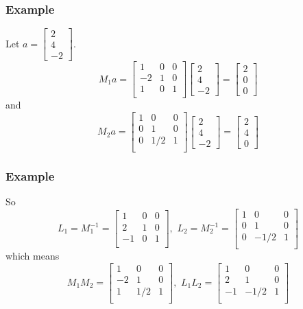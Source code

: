 \documentclass[10pt]{beamer}
\begin{document}
\begin{frame}\frametitle{Example}
Let $a=\begin{bmatrix}2 \\ 4 \\ -2\end{bmatrix}$.
\[
M_1 a =
\begin{bmatrix}
  1 & 0 & 0\\
-2 & 1 & 0\\
1 & 0 & 1\\
\end{bmatrix}
\begin{bmatrix}
2 \\ 4 \\ -2
\end{bmatrix}
     =
\begin{bmatrix}
2 \\ 0 \\ 0
\end{bmatrix}
\]
and
\[
M_2 a =
\begin{bmatrix}
  1 & 0 & 0\\
0 & 1 & 0\\
0 & 1/2 & 1\\
\end{bmatrix}
\begin{bmatrix}
2 \\ 4 \\ -2
\end{bmatrix}
      =
\begin{bmatrix}
2 \\ 4 \\ 0
\end{bmatrix}
\]
\end{frame}
\begin{frame}\frametitle{Example}
  So 
\[
L_1 = M_1^{-1} = 
\begin{bmatrix}
  1 & 0 & 0\\
2 & 1 & 0\\
-1 & 0 & 1\\
\end{bmatrix},\,\,
L_2 = M_2^{-1} = 
\begin{bmatrix}
  1 & 0 & 0\\
0 & 1 & 0\\
0 & -1/2 & 1\\
\end{bmatrix}
\]
which means
\[
M_1 M_2 =
\begin{bmatrix}
  1 & 0 & 0\\
-2 & 1 & 0\\
1 & 1/2 & 1\\
\end{bmatrix},\,\,
L_1 L_2 =
\begin{bmatrix}
  1 & 0 & 0\\
2 & 1 & 0\\
-1 & -1/2 & 1\\
\end{bmatrix}
\]
\end{frame}
\end{document}
